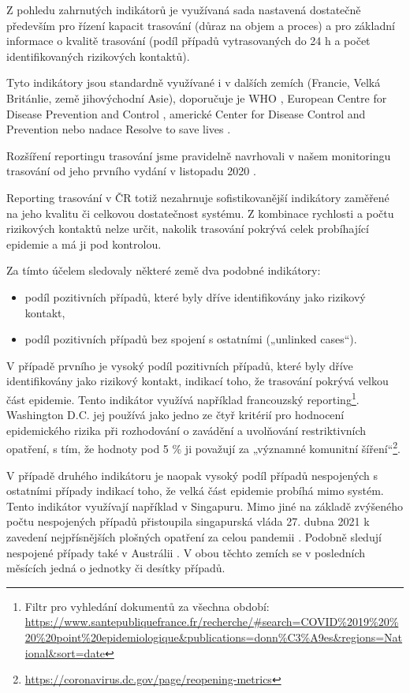 Z pohledu zahrnutých indikátorů je využívaná sada nastavená dostatečně především pro řízení kapacit trasování (důraz na objem a proces) a pro základní informace o kvalitě trasování (podíl případů vytrasovaných do 24 h a počet identifikovaných rizikových kontaktů).

Tyto indikátory jsou standardně využívané i v dalších zemích (Francie, Velká Británlie, země jihovýchodní Asie), doporučuje je WHO \cite{tr_WHO_2021}, European Centre for Disease Prevention and Control \cite{tr_ECDC_2020} , americké Center for Disease Control and Prevention \cite{tr_CDC_2020} nebo nadace Resolve to save lives \cite{tr_contact_tracing}.

Rozšíření reportingu trasování jsme pravidelně navrhovali v našem monitoringu trasování od jeho prvního vydání v listopadu 2020 \cite{tr_bisop07}.

Reporting trasování v ČR totiž nezahrnuje sofistikovanější indikátory zaměřené na jeho kvalitu či celkovou dostatečnost systému. Z kombinace rychlosti a počtu rizikových kontaktů nelze určit, nakolik trasování pokrývá celek probíhající epidemie a má ji pod kontrolou.

Za tímto účelem sledovaly některé země dva podobné indikátory:
\begin{itemize}
\item podíl pozitivních případů, které byly dříve identifikovány jako rizikový kontakt,
\item podíl pozitivních případů bez spojení s ostatními („unlinked cases“).
\end{itemize}

V případě prvního je vysoký podíl pozitivních případů, které byly dříve identifikovány jako rizikový kontakt, indikací toho, že trasování pokrývá velkou část epidemie. Tento indikátor využívá například francouzský reporting\footnote{Filtr pro vyhledání dokumentů za všechna období: \url{https://www.santepubliquefrance.fr/recherche/\#search=COVID\%2019\%20\%20\%20point\%20epidemiologique&publications=donn\%C3\%A9es&regions=National&sort=date}}. Washington D.C. jej používá jako jedno ze čtyř kritérií pro hodnocení epidemického rizika při rozhodování o zavádění a uvolňování restriktivních opatření, s tím, že hodnoty pod 5 \% ji považují za „významné komunitní šíření“\footnote{\url{https://coronavirus.dc.gov/page/reopening-metrics}}.


V případě druhého indikátoru je naopak vysoký podíl případů nespojených s ostatními případy indikací toho, že velká část epidemie probíhá mimo systém. Tento indikátor využívají například v Singapuru. Mimo jiné na základě zvýšeného počtu nespojených případů přistoupila singapurská vláda 27. dubna 2021 k zavedení nejpřísnějších plošných opatření za celou pandemii \cite{tr_Singapour}. Podobně sledují nespojené případy také v Austrálii \cite{tr_australie}. V obou těchto zemích se v posledních měsících jedná o jednotky či desítky případů.


